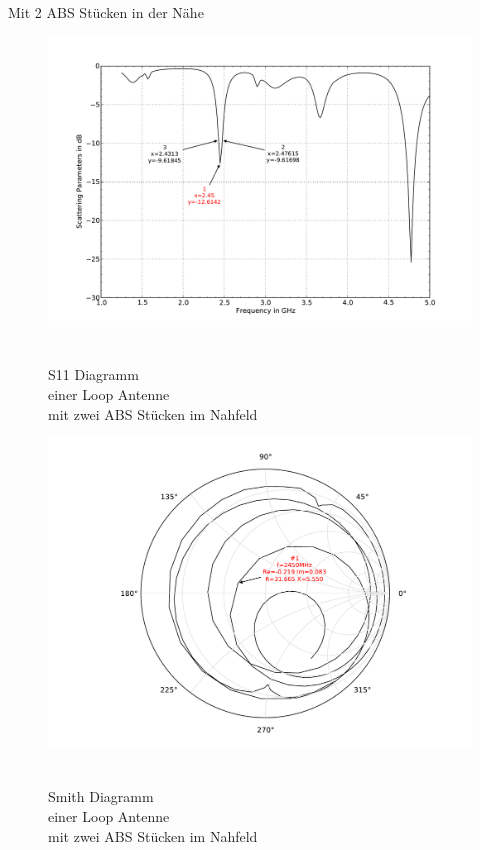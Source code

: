 Mit 2 ABS Stücken in der Nähe
\begin{figure}[!h]
\begin{center}
  \includegraphics[width=\linewidth]{content/bilder/Evaluation/Loop/Kurz3/S11Loop2ABS.pdf}
  \caption{\\S11 Diagramm \\einer Loop Antenne \\mit zwei ABS Stücken im Nahfeld}\label{fig:S11_Loop_2ABS_5}
\endminipage%
{}
  \includegraphics[width=\linewidth]{content/bilder/Evaluation/Loop/Kurz3/SmithLoop2ABS.pdf}
  \caption{\\Smith Diagramm \\einer Loop Antenne \\mit zwei ABS Stücken im Nahfeld}\label{fig:Smith_Loop_2ABS_6}
\endminipage
\end{center}
\end{figure}

